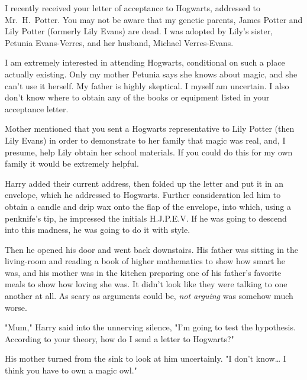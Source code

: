\begin{writtenNote}


I recently received your letter of acceptance to Hogwarts, addressed to
Mr.~H.~Potter. You may not be aware that my genetic parents, James Potter and
Lily Potter (formerly Lily Evans) are dead. I was adopted by Lily's sister,
Petunia Evans-Verres, and her husband, Michael Verres-Evans.

I am extremely interested in attending Hogwarts, conditional on such a
place actually existing. Only my mother Petunia says she knows about magic, and
she can't use it herself. My father is highly skeptical. I myself am uncertain.
I also don't know where to obtain any of the books or equipment listed in your
acceptance letter.

Mother mentioned that you sent a Hogwarts representative to Lily Potter
(then Lily Evans) in order to demonstrate to her family that magic was real,
and, I presume, help Lily obtain her school materials. If you could do this for
my own family it would be extremely helpful.

\end{writtenNote}

Harry added their current address, then folded up the letter and put it in an
envelope, which he addressed to Hogwarts. Further consideration led him to
obtain a candle and drip wax onto the flap of the envelope, into which, using a
penknife's tip, he impressed the initials H.J.P.E.V. If he was going to descend
into this madness, he was going to do it with style.

Then he opened his door and went back downstairs. His
father was sitting in the living-room and reading a book of
higher mathematics to show how smart he was, and his mother
was in the kitchen preparing one of his father's favorite
meals to show how loving she was. It didn't look like they
were talking to one another at all. As scary as arguments
could be, \emph{not arguing} was somehow much worse.

"Mum," Harry said into the unnerving silence, "I'm going to
test the hypothesis. According to your theory, how do I
send a letter to Hogwarts?"

His mother turned from the sink to look at him uncertainly.
"I don't know{\ldots} I think you have to own a magic owl."

